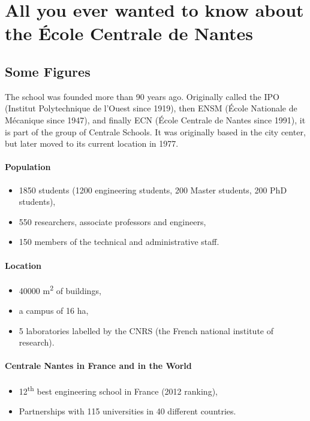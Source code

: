 \section{All you ever wanted to know about the École Centrale de Nantes}
\subsection{Some Figures}
The school was founded more than 90 years ago.
Originally called the IPO (Institut Polytechnique de l'Ouest since 1919), then ENSM (École Nationale de Mécanique since 1947), and finally ECN (École Centrale de Nantes since 1991), it is part of the group of Centrale Schools.
It was originally based in the city center, but later moved to its current location in 1977.

\paragraph{Population}
\begin{itemize}
  \item 1850 students (1200 engineering students, 200 Master students, 200 PhD students),
  \item 550 researchers, associate professors and engineers,
  \item 150 members of the technical and administrative staff.
\end{itemize}
\paragraph{Location}
\begin{itemize}
  \item 40000 m\textsuperscript{2} of buildings,
  \item a campus of 16 ha,
  \item 5 laboratories labelled by the CNRS (the French national institute of research).
\end{itemize}
\paragraph{Centrale Nantes in France and in the World}
\begin{itemize}
  \item 12\textsuperscript{th} best engineering school in France (2012 ranking),
  \item Partnerships with 115 universities in 40 different countries.
\end{itemize}

